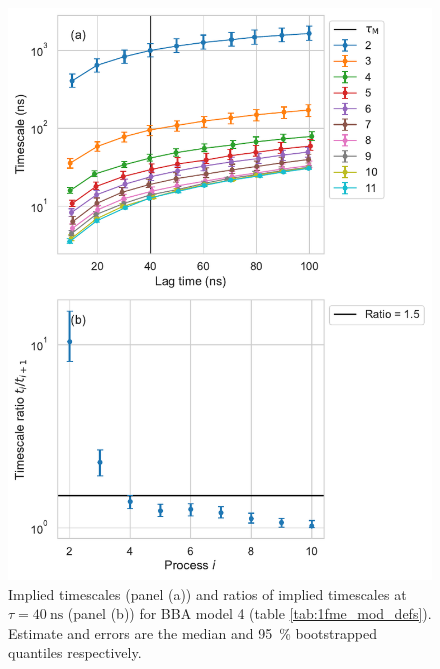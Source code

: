\documentclass{article}
\begin{document}
\begin{figure}
    \centering
    \includegraphics[height=0.65\textheight]{figures/its/bba/BBA_model_logit(dist.)_method_m3.pdf}
    \caption{Implied timescales (panel (a)) and ratios of implied timescales at $\tau=\SI{40}{\nano\second}$ (panel (b)) for BBA model 4 (table \ref{tab:1fme_mod_defs}). Estimate and errors are the median and \SI{95}{\percent} bootstrapped quantiles respectively.}
    \label{fig:its_bba_4}
\end{figure}
\end{document}
